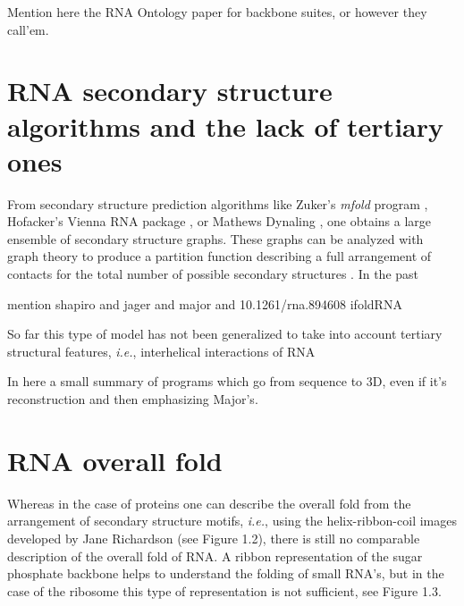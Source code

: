 Mention here the RNA Ontology paper for backbone suites, or however
they call'em.


\section{RNA secondary structure algorithms and the lack of tertiary ones}
From secondary structure prediction algorithms like Zuker's
\textit{mfold} program \cite{zuker2003}, Hofacker's Vienna RNA
package \cite{hofacker1994}, or Mathews Dynaling \cite{mathews2002},  
one obtains a large ensemble of secondary structure graphs. 
These graphs can be analyzed with graph
theory to produce a partition function describing a full arrangement
of contacts for the total number of possible secondary structures
\cite{chen2000}. In the past 

mention shapiro and jager and major
and 10.1261/rna.894608 ifoldRNA

So far this type of model has not been generalized
to take into account tertiary structural features, \textit{i.e.},
interhelical interactions of RNA

In here a small summary of programs which go from sequence to 3D, even 
if it's reconstruction and then emphasizing Major's.


\section{RNA overall fold}
Whereas in the case of proteins one can describe the overall fold
from the arrangement of secondary structure motifs, \textit{i.e.}, using the
helix-ribbon-coil images developed by Jane Richardson
\cite{richardson2000} (see Figure 1.2), there is still no comparable
description of the overall fold of RNA. A ribbon
representation of the sugar phosphate backbone helps to understand the
folding of small RNA's, but in the case of the ribosome this type of 
representation is not sufficient, see Figure 1.3.


